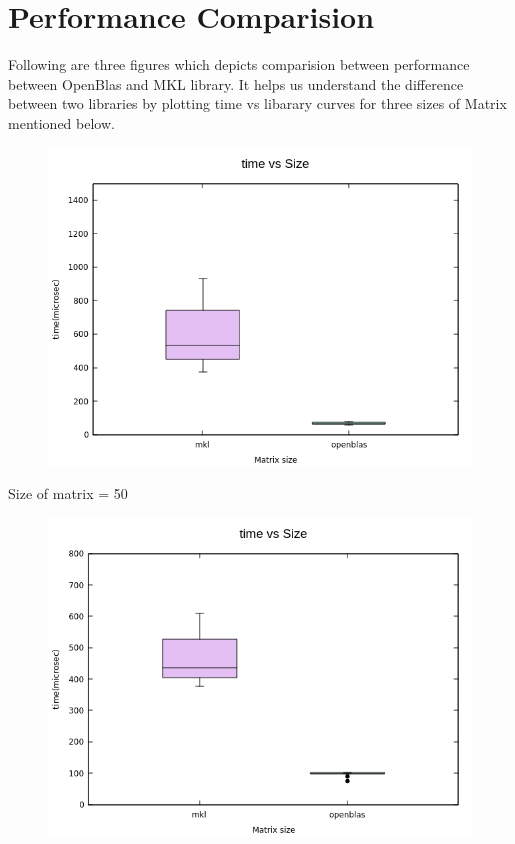 \documentclass[14pt]{extarticle}
\begin{document}
\section{Performance Comparision}
Following are three figures which depicts comparision between performance between OpenBlas and MKL library. It helps us understand the difference between two libraries by plotting time vs libarary curves for three sizes of Matrix mentioned below.
\newpage
\begin{figure}[t]
\centering
\includegraphics[width=16cm]{50x3.png}
\end{figure}
Size of matrix = 50 
\newpage
\begin{figure}[t]
\centering
\includegraphics[width=16cm]{75x3.png}
\end{figure}
\end{document}
